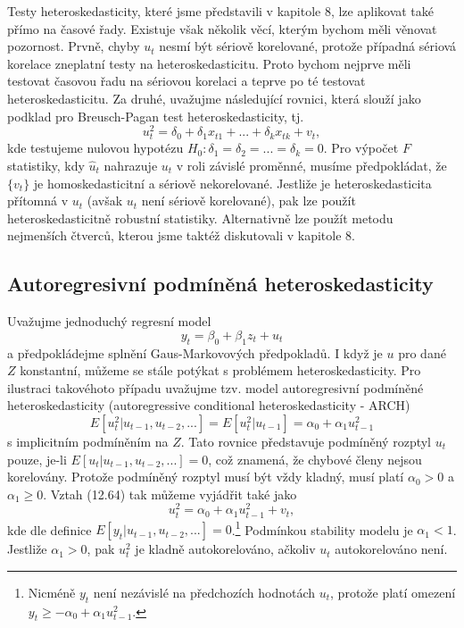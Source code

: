 Testy heteroskedasticity, které jsme představili v kapitole 8, lze aplikovat také přímo na časové řady. Existuje však několik věcí, kterým bychom měli věnovat pozornost. Prvně, chyby $u_t$ nesmí být sériově korelované, protože případná sériová korelace zneplatní testy na heteroskedasticitu. Proto bychom nejprve měli testovat časovou řadu na sériovou korelaci a teprve po té testovat heteroskedasticitu. Za druhé, uvažujme následující rovnici, která slouží jako podklad pro Breusch-Pagan test heteroskedasticity, tj.
\begin{equation}
u^2_t = \delta_0 + \delta_1 x_{t1} + ... + \delta_k x_{tk} + v_t,
\end{equation}
kde testujeme nulovou hypotézu $H_0: \delta_1 = \delta_2 = ... = \delta_k = 0$. Pro výpočet $F$ statistiky, kdy $\hat{u}_t$ nahrazuje $u_t$ v roli závislé proměnné, musíme předpokládat, že $\{v_t\}$ je homoskedasticitní a sériově nekorelované. Jestliže je heteroskedasticita přítomná v $u_t$ (avšak $u_t$ není sériově korelované), pak lze použít heteroskedasticitně robustní statistiky. Alternativně lze použít metodu nejmenších čtverců, kterou jsme taktéž diskutovali v kapitole 8.

\subsection{Autoregresivní podmíněná heteroskedasticity}

Uvažujme jednoduchý regresní model
\begin{equation}
y_t = \beta_0 + \beta_1 z_t + u_t
\end{equation}
a předpokládejme splnění Gaus-Markovových předpokladů. I když je $u$ pro dané $Z$ konstantní, můžeme se stále potýkat s problémem heteroskedasticity. Pro ilustraci takovéhoto případu uvažujme tzv. model autoregresivní podmíněné heteroskedasticity (autoregressive conditional heteroskedasticity - ARCH)
\begin{equation}
E[u^2_t | u_{t-1}, u_{t-2}, ...] = E[u^2_t|u_{t-1}] = \alpha_0 + \alpha_1 u^2_{t-1}
\end{equation}
s implicitním podmíněním na $Z$. Tato rovnice představuje podmíněný rozptyl $u_t$ pouze, je-li $E[u_t | u_{t - 1}, u_{t - 2}, ...] = 0$, což znamená, že chybové členy nejsou korelovány. Protože podmíněný rozptyl musí být vždy kladný, musí platí $\alpha_0 > 0$ a $\alpha_1 \ge 0$. Vztah (12.64) tak můžeme vyjádřit také jako
\begin{equation}
u^2_t = \alpha_0 + \alpha_1 u^2_{t - 1} + v_t,
\end{equation}
kde dle definice $E[y_t | u_{t - 1}, u_{t - 2}, ...] = 0$.\footnote{Nicméně $y_t$ není nezávislé na předchozích hodnotách $u_t$, protože platí omezení $y_t \ge -\alpha_0 + \alpha_1 u^2_{t - 1}$.} Podmínkou stability modelu je $\alpha_1 < 1$. Jestliže $\alpha_1 > 0$, pak $u_t^2$ je kladně autokorelováno, ačkoliv $u_t$ autokorelováno není.

